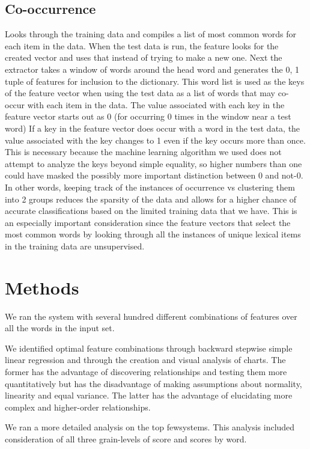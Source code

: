 \documentclass{article}
\begin{document}
\subsection{Co-occurrence}

Looks through the training data and compiles a list of most common words for
each item in the data. When the test data is run, the feature looks for the
created vector and uses that instead of trying to make a new one. Next the
extractor takes a window of words around the head word and generates the 0, 1
tuple of features for inclusion to the dictionary. This word list is used as the
keys of the feature vector when using the test data as a list of words that may
co-occur with each item in the data. The value associated with each key in the
feature vector starts out as 0 (for occurring 0 times in the window near a test
word) If a key in the feature vector does occur with a word in the test data,
the value associated with the key changes to 1 even if the key occurs more than
once.  This is necessary because the machine learning algorithm we used does not
attempt to analyze the keys beyond simple equality, so higher numbers than one
could have masked the possibly more important distinction between 0 and not-0.
In other words, keeping track of the instances of occurrence vs clustering them
into 2 groups reduces the sparsity of the data and allows for a higher chance of
accurate classifications based on the limited training data that we have. This
is an especially important consideration since the feature vectors that select
the most common words by looking through all the instances of unique lexical
items in the training data are unsupervised.

\section{Methods}
\newcommand\few{few}

We ran the system with several hundred different combinations of features over
all the words in the input set.

We identified optimal feature combinations through backward stepwise simple
linear regression and through the creation and visual analysis of charts. The
former has the advantage of discovering relationships and testing them more
quantitatively but has the disadvantage of making assumptions about normality,
linearity and equal variance.  The latter has the advantage of elucidating more
complex and higher-order relationships.

We ran a more detailed analysis on the top \few systems.  This analysis included
consideration of all three grain-levels of score and scores by word.
\end{document}
